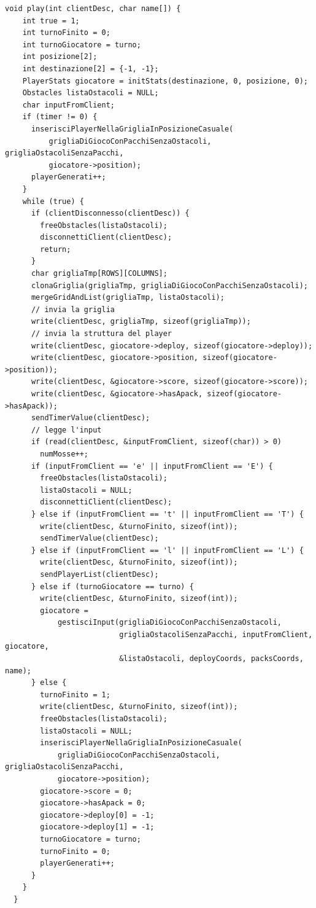 \documentclass[a4paper]{article}
\begin{document}
\begin{lstlisting}[caption=Funzione play del server, label=alg:playServer]
  void play(int clientDesc, char name[]) {
    int true = 1;
    int turnoFinito = 0;
    int turnoGiocatore = turno;
    int posizione[2];
    int destinazione[2] = {-1, -1};
    PlayerStats giocatore = initStats(destinazione, 0, posizione, 0);
    Obstacles listaOstacoli = NULL;
    char inputFromClient;
    if (timer != 0) {
      inserisciPlayerNellaGrigliaInPosizioneCasuale(
          grigliaDiGiocoConPacchiSenzaOstacoli, grigliaOstacoliSenzaPacchi,
          giocatore->position);
      playerGenerati++;
    }
    while (true) {
      if (clientDisconnesso(clientDesc)) {
        freeObstacles(listaOstacoli);
        disconnettiClient(clientDesc);
        return;
      }
      char grigliaTmp[ROWS][COLUMNS];
      clonaGriglia(grigliaTmp, grigliaDiGiocoConPacchiSenzaOstacoli);
      mergeGridAndList(grigliaTmp, listaOstacoli);
      // invia la griglia
      write(clientDesc, grigliaTmp, sizeof(grigliaTmp));
      // invia la struttura del player
      write(clientDesc, giocatore->deploy, sizeof(giocatore->deploy));
      write(clientDesc, giocatore->position, sizeof(giocatore->position));
      write(clientDesc, &giocatore->score, sizeof(giocatore->score));
      write(clientDesc, &giocatore->hasApack, sizeof(giocatore->hasApack));
      sendTimerValue(clientDesc);
      // legge l'input
      if (read(clientDesc, &inputFromClient, sizeof(char)) > 0)
        numMosse++;
      if (inputFromClient == 'e' || inputFromClient == 'E') {
        freeObstacles(listaOstacoli);
        listaOstacoli = NULL;
        disconnettiClient(clientDesc);
      } else if (inputFromClient == 't' || inputFromClient == 'T') {
        write(clientDesc, &turnoFinito, sizeof(int));
        sendTimerValue(clientDesc);
      } else if (inputFromClient == 'l' || inputFromClient == 'L') {
        write(clientDesc, &turnoFinito, sizeof(int));
        sendPlayerList(clientDesc);
      } else if (turnoGiocatore == turno) {
        write(clientDesc, &turnoFinito, sizeof(int));
        giocatore =
            gestisciInput(grigliaDiGiocoConPacchiSenzaOstacoli,
                          grigliaOstacoliSenzaPacchi, inputFromClient, giocatore,
                          &listaOstacoli, deployCoords, packsCoords, name);
      } else {
        turnoFinito = 1;
        write(clientDesc, &turnoFinito, sizeof(int));
        freeObstacles(listaOstacoli);
        listaOstacoli = NULL;
        inserisciPlayerNellaGrigliaInPosizioneCasuale(
            grigliaDiGiocoConPacchiSenzaOstacoli, grigliaOstacoliSenzaPacchi,
            giocatore->position);
        giocatore->score = 0;
        giocatore->hasApack = 0;
        giocatore->deploy[0] = -1;
        giocatore->deploy[1] = -1;
        turnoGiocatore = turno;
        turnoFinito = 0;
        playerGenerati++;
      }
    }
  }  
\end{lstlisting}
\end{document}
